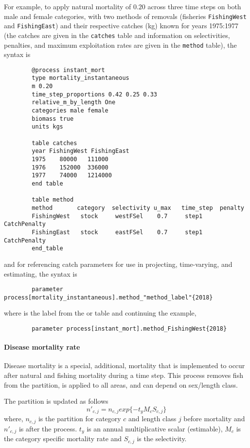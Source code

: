 For example, to apply natural mortality of $0.20$ across three time steps on both male and female categories, with two methods of removals (fisheries \texttt{FishingWest} and \texttt{FishingEast}) and their respective catches (kg) known for years 1975:1977 (the catches are given in the \texttt{catches} table and information on selectivities, penalties, and maximum exploitation rates are given in the \texttt{method} table), the syntax is


{\small{\begin{verbatim}
		@process instant_mort
		type mortality_instantaneous
		m 0.20
		time_step_proportions 0.42 0.25 0.33
		relative_m_by_length One
		categories male female
		biomass true
		units kgs
		
		table catches
		year FishingWest FishingEast
		1975	80000	111000
		1976	152000	336000
		1977	74000	1214000
		end table
		
		table method
		method       category  selectivity u_max   time_step  penalty
		FishingWest   stock     westFSel    0.7     step1     CatchPenalty
		FishingEast   stock     eastFSel    0.7     step1     CatchPenalty
		end_table
		\end{verbatim}}}

and for referencing catch parameters for use in projecting, time-varying, and estimating, the syntax is

{\small{\begin{verbatim}
		parameter process[mortality_instantaneous].method_"method_label"{2018}
		\end{verbatim}}}

where  is the label from the  or  table and continuing the example,

{\small{\begin{verbatim}
		parameter process[instant_mort].method_FishingWest{2018}
		\end{verbatim}}}


\paragraph{Disease mortality rate}\label{sec:Process-Length-DiseaseMortalityRate} 
Disease mortality is a special, additional, mortality that is implemented to occur after natural and fishing mortality during a time step. This process removes fish from the partition, is applied to all areas, and can depend on sex/length class.

The partition is updated as follows
\begin{equation}
	n'_{c,j} = n_{c,j}  exp\{-t_y M_{c} S_{c,j} \}
\end{equation}
%
where, \(n_{c,j}\) is the partition for category \(c\) and length class \(j\) before mortality and \(n'_{c,j}\)  is after the process. \(t_y\) is an annual multiplicative scalar (estimable), \(M_{c}\) is the category specific mortality rate and \(S_{c,j}\) is the selectivity.
 

